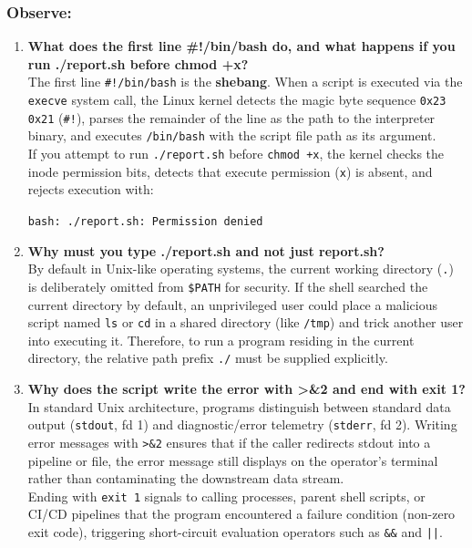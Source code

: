 \documentclass{labreport}
\begin{document}
\subsubsection*{Observe:}
\begin{enumerate}[leftmargin=*]
    \item \textbf{What does the first line \#!/bin/bash do, and what happens if you run ./report.sh before chmod +x?}\\[0.2em]
    The first line \texttt{\#!/bin/bash} is the \textbf{shebang}. When a script is executed via the \texttt{execve} system call, the Linux kernel detects the magic byte sequence \texttt{0x23 0x21} (\texttt{\#!}), parses the remainder of the line as the path to the interpreter binary, and executes \texttt{/bin/bash} with the script file path as its argument.\\
    If you attempt to run \texttt{./report.sh} before \texttt{chmod +x}, the kernel checks the inode permission bits, detects that execute permission (\texttt{x}) is absent, and rejects execution with:
    \begin{center}
    \texttt{bash: ./report.sh: Permission denied}
    \end{center}

    \item \textbf{Why must you type ./report.sh and not just report.sh?}\\[0.2em]
    By default in Unix-like operating systems, the current working directory (\texttt{.}) is deliberately omitted from \texttt{\$PATH} for security. If the shell searched the current directory by default, an unprivileged user could place a malicious script named \texttt{ls} or \texttt{cd} in a shared directory (like \texttt{/tmp}) and trick another user into executing it. Therefore, to run a program residing in the current directory, the relative path prefix \texttt{./} must be supplied explicitly.

    \item \textbf{Why does the script write the error with >\&2 and end with exit 1?}\\[0.2em]
    In standard Unix architecture, programs distinguish between standard data output (\texttt{stdout}, fd 1) and diagnostic/error telemetry (\texttt{stderr}, fd 2). Writing error messages with \texttt{>\&2} ensures that if the caller redirects stdout into a pipeline or file, the error message still displays on the operator's terminal rather than contaminating the downstream data stream.\\
    Ending with \texttt{exit 1} signals to calling processes, parent shell scripts, or CI/CD pipelines that the program encountered a failure condition (non-zero exit code), triggering short-circuit evaluation operators such as \texttt{\&\&} and \texttt{||}.
\end{enumerate}
\end{document}
